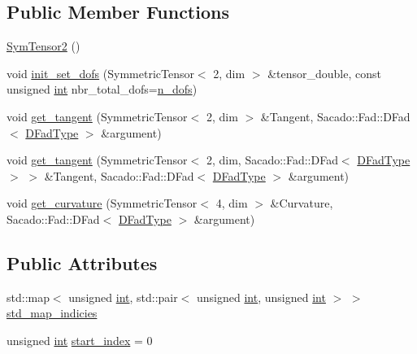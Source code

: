 \subsection*{Public Member Functions}
\begin{DoxyCompactItemize}
\item 
\hyperlink{classSacado__Wrapper_1_1SymTensor2_ae43e523ee18d7bf678e5d426df92cd49}{Sym\+Tensor2} ()
\item 
void \hyperlink{classSacado__Wrapper_1_1SymTensor2_a54495897cfdd887d0081015571a28107}{init\+\_\+set\+\_\+dofs} (Symmetric\+Tensor$<$ 2, dim $>$ \&tensor\+\_\+double, const unsigned \hyperlink{CMakeCache_8txt_a79a3d8790b2588b09777910863574e09}{int} nbr\+\_\+total\+\_\+dofs=\hyperlink{classSacado__Wrapper_1_1SymTensor2_ad9d6542de5481e0d41bd1831cb0aeaff}{n\+\_\+dofs})
\item 
void \hyperlink{classSacado__Wrapper_1_1SymTensor2_aad13518e282739f93126adb9db351474}{get\+\_\+tangent} (Symmetric\+Tensor$<$ 2, dim $>$ \&Tangent, Sacado\+::\+Fad\+::\+D\+Fad$<$ \hyperlink{Sacado__Wrapper_8h_a7e0893207b87dad05c66a34baac8ed2e}{D\+Fad\+Type} $>$ \&argument)
\item 
void \hyperlink{classSacado__Wrapper_1_1SymTensor2_a7cd555be3d8c00559af7954671f417fa}{get\+\_\+tangent} (Symmetric\+Tensor$<$ 2, dim, Sacado\+::\+Fad\+::\+D\+Fad$<$ \hyperlink{Sacado__Wrapper_8h_a7e0893207b87dad05c66a34baac8ed2e}{D\+Fad\+Type} $>$ $>$ \&Tangent, Sacado\+::\+Fad\+::\+D\+Fad$<$ \hyperlink{Sacado__Wrapper_8h_a7e0893207b87dad05c66a34baac8ed2e}{D\+Fad\+Type} $>$ \&argument)
\item 
void \hyperlink{classSacado__Wrapper_1_1SymTensor2_aeff4168705676c8f8c050e9ea1fc46be}{get\+\_\+curvature} (Symmetric\+Tensor$<$ 4, dim $>$ \&Curvature, Sacado\+::\+Fad\+::\+D\+Fad$<$ \hyperlink{Sacado__Wrapper_8h_a7e0893207b87dad05c66a34baac8ed2e}{D\+Fad\+Type} $>$ \&argument)
\end{DoxyCompactItemize}
\subsection*{Public Attributes}
\begin{DoxyCompactItemize}
\item 
std\+::map$<$ unsigned \hyperlink{CMakeCache_8txt_a79a3d8790b2588b09777910863574e09}{int}, std\+::pair$<$ unsigned \hyperlink{CMakeCache_8txt_a79a3d8790b2588b09777910863574e09}{int}, unsigned \hyperlink{CMakeCache_8txt_a79a3d8790b2588b09777910863574e09}{int} $>$ $>$ \hyperlink{classSacado__Wrapper_1_1SymTensor2_a1c6b89438714315ae209f4687b687505}{std\+\_\+map\+\_\+indicies}
\item 
unsigned \hyperlink{CMakeCache_8txt_a79a3d8790b2588b09777910863574e09}{int} \hyperlink{classSacado__Wrapper_1_1SymTensor2_ab14d036243a7505e918af354b1cb74d9}{start\+\_\+index} = 0
\end{DoxyCompactItemize}
